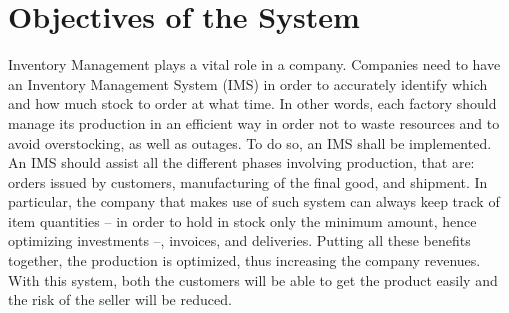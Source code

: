 \section{Objectives of the System}
Inventory Management plays a vital role in a company. Companies need to have an Inventory Management System (IMS) in order to accurately identify which and how much stock to order at what time. In other words, each factory should manage its production in an efficient way in order not to waste resources and to avoid overstocking, as well as outages. To do so, an IMS shall be implemented. An IMS should assist all the different phases involving production, that are: orders issued by customers, manufacturing of the final good, and shipment. In particular, the company that makes use of such system can always keep track of item quantities -- in order to hold in stock only the minimum amount, hence optimizing investments --, invoices, and deliveries. Putting all these benefits together, the production is optimized, thus increasing the company revenues.\\
With this system, both the customers will be able to get the product easily and the risk of the seller will be reduced.